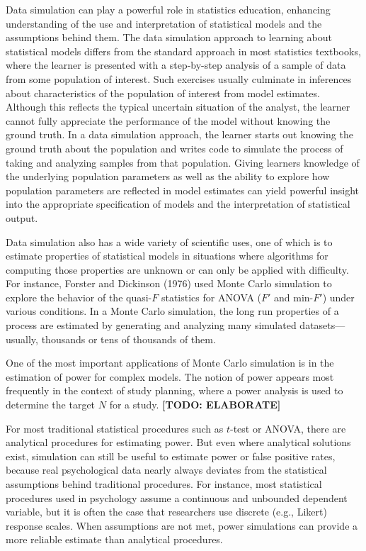 \documentclass[doc,floatsintext]{apa6}
\begin{document}
Data simulation can play a powerful role in statistics education,
enhancing understanding of the use and interpretation of statistical
models and the assumptions behind them. The data simulation approach to
learning about statistical models differs from the standard approach in
most statistics textbooks, where the learner is presented with a
step-by-step analysis of a sample of data from some population of
interest. Such exercises usually culminate in inferences about
characteristics of the population of interest from model estimates.
Although this reflects the typical uncertain situation of the analyst,
the learner cannot fully appreciate the performance of the model without
knowing the ground truth. In a data simulation approach, the learner
starts out knowing the ground truth about the population and writes code
to simulate the process of taking and analyzing samples from that
population. Giving learners knowledge of the underlying population
parameters as well as the ability to explore how population parameters
are reflected in model estimates can yield powerful insight into the
appropriate specification of models and the interpretation of
statistical output.

Data simulation also has a wide variety of scientific uses, one of which
is to estimate properties of statistical models in situations where
algorithms for computing those properties are unknown or can only be
applied with difficulty. For instance, Forster and Dickinson (1976) used
Monte Carlo simulation to explore the behavior of the quasi-\(F\)
statistics for ANOVA (\(F'\) and min-\(F'\)) under various conditions.
In a Monte Carlo simulation, the long run properties of a process are
estimated by generating and analyzing many simulated datasets---usually,
thousands or tens of thousands of them.

One of the most important applications of Monte Carlo simulation is in
the estimation of power for complex models. The notion of power appears
most frequently in the context of study planning, where a power analysis
is used to determine the target \(N\) for a study. \textbf{{[}TODO:
ELABORATE{]}}

For most traditional statistical procedures such as \(t\)-test or ANOVA,
there are analytical procedures for estimating power. But even where
analytical solutions exist, simulation can still be useful to estimate
power or false positive rates, because real psychological data nearly
always deviates from the statistical assumptions behind traditional
procedures. For instance, most statistical procedures used in psychology
assume a continuous and unbounded dependent variable, but it is often
the case that researchers use discrete (e.g., Likert) response scales.
When assumptions are not met, power simulations can provide a more
reliable estimate than analytical procedures.
\end{document}
